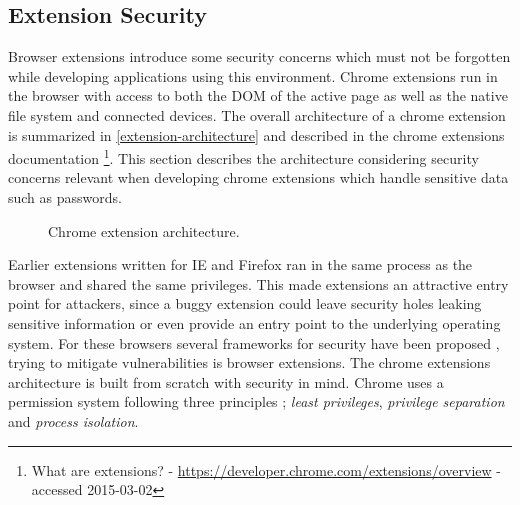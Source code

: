 \subsection{Extension Security}\label{extension-sec}
\par Browser extensions introduce some security concerns which must not be forgotten while developing applications using this environment. Chrome extensions run in the browser with access to both the DOM of the active page as well as the native file system and connected devices. The overall architecture of a chrome extension is summarized in \autoref{extension-architecture} and described in the chrome extensions documentation \footnote{What are extensions? - \url{https://developer.chrome.com/extensions/overview} - accessed 2015-03-02}. This section describes the architecture considering security concerns relevant when developing chrome extensions which handle sensitive data such as passwords.



\begin{figure}[ht]
    \caption{Chrome extension architecture.}
    \label{extension-architecture}
\end{figure}

\par Earlier extensions written for IE and Firefox ran in the same process as the browser and shared the same privileges. This made extensions an attractive entry point for attackers, since a buggy extension could leave security holes leaking sensitive information or even provide an entry point to the underlying operating system. For these browsers several frameworks for security have been proposed \cite{firefox-ie, js-info-flow}, trying to mitigate vulnerabilities is browser extensions. The chrome extensions architecture is built from scratch with security in mind. Chrome uses a permission system following three principles \cite{liu-chrome}; \emph{least privileges}, \emph{privilege separation} and \emph{process isolation}. 

